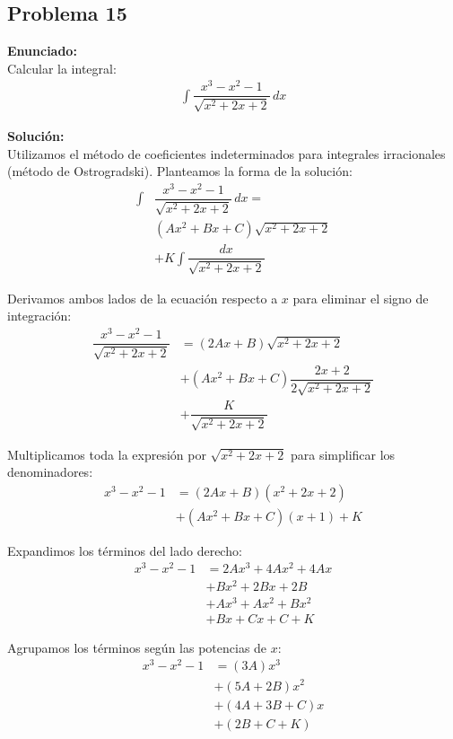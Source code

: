 \subsection*{Problema 15}

\textbf{Enunciado:} \\
Calcular la integral:
\begin{align*}
\int \dfrac{x^3 - x^2 - 1}{\sqrt{x^2 + 2x + 2}} \, dx
\end{align*}

\textbf{Solución:} \\
Utilizamos el método de coeficientes indeterminados para integrales irracionales (método de Ostrogradski). Planteamos la forma de la solución:
\begin{align*}
\int &\dfrac{x^3 - x^2 - 1}{\sqrt{x^2 + 2x + 2}} \, dx = \\
&(Ax^2 + Bx + C)\sqrt{x^2 + 2x + 2} \\
&+ K \int \dfrac{dx}{\sqrt{x^2 + 2x + 2}}
\end{align*}

Derivamos ambos lados de la ecuación respecto a $x$ para eliminar el signo de integración:
\begin{align*}
\dfrac{x^3 - x^2 - 1}{\sqrt{x^2 + 2x + 2}} &= (2Ax + B)\sqrt{x^2 + 2x + 2} \\
&+ (Ax^2 + Bx + C)\dfrac{2x + 2}{2\sqrt{x^2 + 2x + 2}} \\
&+ \dfrac{K}{\sqrt{x^2 + 2x + 2}}
\end{align*}

Multiplicamos toda la expresión por $\sqrt{x^2 + 2x + 2}$ para simplificar los denominadores:
\begin{align*}
x^3 - x^2 - 1 &= (2Ax + B)(x^2 + 2x + 2) \\
&+ (Ax^2 + Bx + C)(x + 1) + K
\end{align*}

Expandimos los términos del lado derecho:
\begin{align*}
x^3 - x^2 - 1 &= 2Ax^3 + 4Ax^2 + 4Ax \\
&+ Bx^2 + 2Bx + 2B \\
&+ Ax^3 + Ax^2 + Bx^2 \\
&+ Bx + Cx + C + K
\end{align*}

Agrupamos los términos según las potencias de $x$:
\begin{align*}
x^3 - x^2 - 1 &= (3A)x^3 \\
&+ (5A + 2B)x^2 \\
&+ (4A + 3B + C)x \\
&+ (2B + C + K)
\end{align*}


